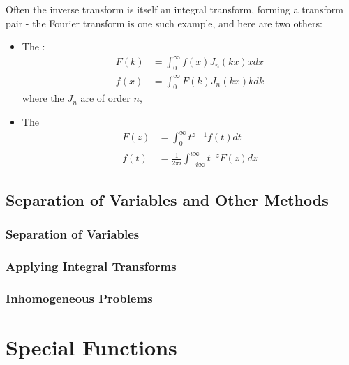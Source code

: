 \documentclass[12pt, a4paper, oneside, openright, titlepage]{book}
\begin{document}
Often the inverse transform is itself an integral transform, forming a transform pair - the Fourier transform is one such example, and here are two others: \begin{itemize}
    \item The : \begin{align*}
            F(k) &= \int_0^{\infty}f(x)J_n(kx)xdx \\
            f(x) &= \int_0^{\infty}F(k)J_n(kx)kdk
    \end{align*}
        where the $J_n$ are  of order $n$,
    \item The  \begin{align*}
            F(z) &= \int_0^{\infty}t^{z-1}f(t)dt \\
            f(t) &= \frac{1}{2\pi i}\int_{-i\infty}^{i\infty}t^{-z}F(z)dz
    \end{align*}
\end{itemize}










\chapter{Separation of Variables and Other Methods}


\section{Separation of Variables}



\section{Applying Integral Transforms}



\section{Inhomogeneous Problems}




\part{Special Functions}
\end{document}
